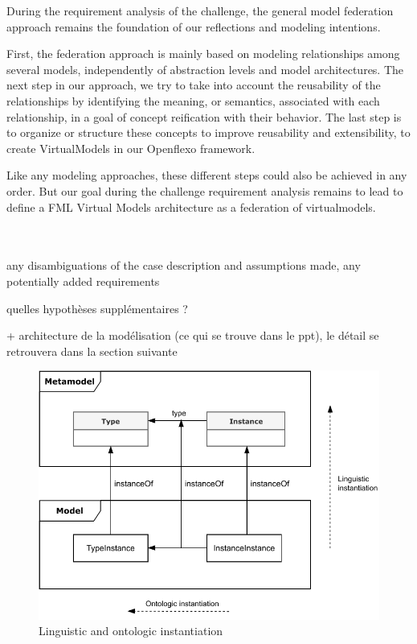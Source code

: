 
During the requirement analysis of the challenge, the general model federation approach remains the foundation of our reflections and modeling intentions. 

First, the federation approach is mainly based on modeling relationships among several models, independently of abstraction levels and model architectures.
The next step in our approach, we try to take into account the reusability of the relationships by identifying the meaning, or semantics, associated with each relationship, in a goal of concept reification with their behavior. The last step is to organize or structure these concepts to improve reusability and extensibility, to create VirtualModels in our Openflexo framework.     

Like any modeling approaches, these different steps could also be achieved in any order. But our goal during the challenge requirement analysis remains to lead to define a FML Virtual Models architecture as a federation of virtualmodels.


~\\
~\\

any disambiguations of the  case  description and assumptions made, any potentially added requirements

quelles hypothèses supplémentaires ? 

+ architecture de la modélisation (ce qui se trouve dans le ppt), le détail se retrouvera dans la section suivante



\begin{figure}
    \centering
    \includegraphics[width=1.0 \columnwidth]{Figures/Instantiation.pdf}
    \caption{Linguistic and ontologic instantiation}
    \label{fig:LinguisticAndOntologicInstantiation}
\end{figure}

